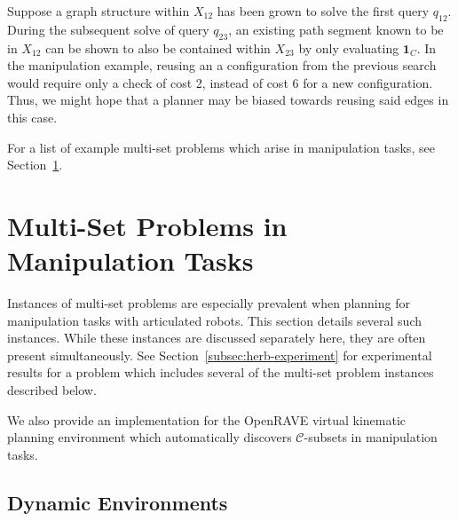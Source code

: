\documentclass{report}
\begin{document}
Suppose a graph structure within ${X_{12}}$ has been grown to solve
the first query $q_{12}$.
During the subsequent solve of query $q_{23}$,
an existing path segment known to be in ${X_{12}}$ can be shown to
also be contained within ${X_{23}}$ by only evaluating $\mathbf{1}_C$.
In the manipulation example,
reusing an a configuration from the previous search
would require only a check of cost 2,
instead of cost 6 for a new configuration.
Thus, we might hope that a planner may be biased towards reusing
said edges in this case.

For a list of example multi-set problems which arise in manipulation
tasks,
see Section~\ref{sec:in-manipulation}.

\section{Multi-Set Problems in Manipulation Tasks}
\label{sec:in-manipulation}

Instances of multi-set problems are especially prevalent when
planning for manipulation tasks with articulated robots.
This section details several such instances.
While these instances are discussed separately here,
they are often present simultaneously.
See Section~\ref{subsec:herb-experiment}
for experimental results for a problem
which includes several of the multi-set problem instances
described below.

We also provide an implementation for the
OpenRAVE\cite{diankov2010openrave}
virtual kinematic planning environment
which automatically discovers $\mathcal{C}$-subsets
in manipulation tasks.

\subsection{Dynamic Environments}
\label{subsec:dynamic-environments}
\end{document}
